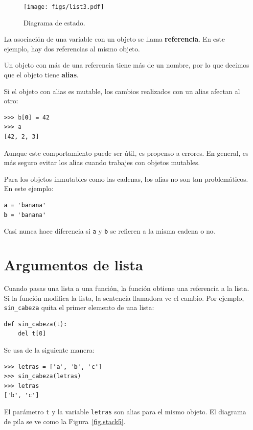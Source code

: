 \documentclass[10pt]{book}
\begin{document}
\begin{figure}
\centerline
{\texttt{[image: figs/list3.pdf]}}
\caption{Diagrama de estado.}
\label{fig.list3}
\end{figure}

La asociación de una variable con un objeto se llama {\bf
referencia}.  En este ejemplo, hay dos referencias al mismo
objeto.

Un objeto con más de una referencia tiene más
de un nombre, por lo que decimos que el objeto tiene {\bf alias}.

Si el objeto con alias es mutable, los cambios realizados con un alias afectan
al otro:

\begin{verbatim}
>>> b[0] = 42
>>> a
[42, 2, 3]
\end{verbatim}
%
Aunque este comportamiento puede ser útil, es propenso a errores.  En general,
es más seguro evitar los alias cuando trabajes con objetos
mutables.

Para los objetos inmutables como las cadenas, los alias no son tan
problemáticos.  En este ejemplo:

\begin{verbatim}
a = 'banana'
b = 'banana'
\end{verbatim}
%
Casi nunca hace diferencia si {\tt a} y {\tt b} se refieren
a la misma cadena o no.


\section{Argumentos de lista}
\label{list.arguments}

Cuando pasas una lista a una función, la función obtiene una referencia a
la lista.  Si la función modifica la lista, la sentencia llamadora ve
el cambio.  Por ejemplo, \verb"sin_cabeza" quita el primer elemento
de una lista:

\begin{verbatim}
def sin_cabeza(t):
    del t[0]
\end{verbatim}
%
Se usa de la siguiente manera:

\begin{verbatim}
>>> letras = ['a', 'b', 'c']
>>> sin_cabeza(letras)
>>> letras
['b', 'c']
\end{verbatim}
%
El parámetro {\tt t} y la variable {\tt letras} son
alias para el mismo objeto.  El diagrama de pila se ve como la
Figura~\ref{fig.stack5}.
\end{document}
